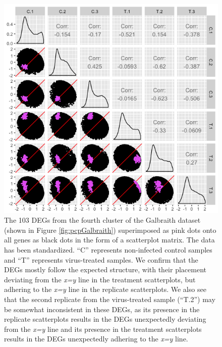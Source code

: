 \documentclass[11pt,a4paper,oldfontcommands,openany]{memoir}
\numberwithin{equation}{section} %
\begin{document}
\begin{figure}[H]
  \includegraphics[width=\textwidth]{Images/GalbraithClust4SM}
  \caption{The 103 DEGs from the fourth cluster of the Galbraith dataset (shown in Figure \ref{fig:pcpGalbraith}) superimposed as pink dots onto all genes as black dots in the form of a scatterplot matrix. The data has been standardized. ``C'' represents non-infected control samples and ``T'' represents virus-treated samples. We confirm that the DEGs mostly follow the expected structure, with their placement deviating from the \textit{x=y} line in the treatment scatterplots, but adhering to the \textit{x=y} line in the replicate scatterplots. We also see that the second replicate from the virus-treated sample (``T.2'') may be somewhat inconsistent in these DEGs, as its presence in the replicate scatterplots results in the DEGs unexpectedly deviating from the \textit{x=y} line and its presence in the treatment scatterplots results in the DEGs unexpectedly adhering to the \textit{x=y} line.}
  \label{fig:GalbraithClust4SM}
\end{figure}
\end{document}
